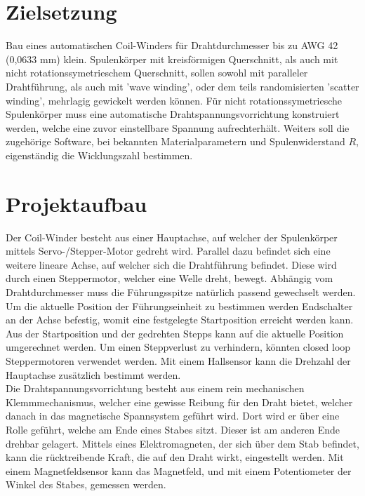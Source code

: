 \section*{Zielsetzung}
Bau eines automatischen Coil-Winders für Drahtdurchmesser bis zu AWG 42 (0,0633 mm) klein. Spulenkörper mit kreisförmigen Querschnitt, als auch mit nicht rotationssymetrieschem Querschnitt, sollen sowohl mit paralleler Drahtführung, als auch mit 'wave winding', oder dem teils randomisierten 'scatter winding', mehrlagig gewickelt werden können. Für nicht rotationssymetriesche Spulenkörper muss eine automatische Drahtspannungsvorrichtung konstruiert werden, welche eine zuvor einstellbare Spannung aufrechterhält. Weiters soll die zugehörige Software, bei bekannten Materialparametern und Spulenwiderstand $R$, eigenständig die Wicklungszahl bestimmen.  

\section*{Projektaufbau}

Der Coil-Winder besteht aus einer Hauptachse, auf welcher der Spulenkörper mittels Servo-/Stepper-Motor gedreht wird. Parallel dazu befindet sich eine weitere lineare Achse, auf welcher sich die Drahtführung befindet. Diese wird durch einen Steppermotor, welcher eine Welle dreht, bewegt. Abhängig vom Drahtdurchmesser muss die Führungsspitze natürlich passend gewechselt werden. Um die aktuelle Position der Führungseinheit zu bestimmen werden Endschalter an der Achse befestig, womit eine festgelegte Startposition erreicht werden kann. Aus der Startposition und der gedrehten Stepps kann auf die aktuelle Position umgerechnet werden. Um einen Steppverlust zu verhindern, könnten closed loop Steppermotoren verwendet werden. Mit einem Hallsensor kann die Drehzahl der Hauptachse zusätzlich bestimmt werden.\\
Die Drahtspannungsvorrichtung besteht aus einem rein mechanischen Klemmmechanismus, welcher eine gewisse Reibung für den Draht bietet, welcher danach in das magnetische Spannsystem geführt wird. Dort wird er über eine Rolle geführt, welche am Ende eines Stabes sitzt. Dieser ist am anderen Ende drehbar gelagert. Mittels eines Elektromagneten, der sich über dem Stab befindet, kann die rücktreibende Kraft, die auf den Draht wirkt, eingestellt werden. Mit einem Magnetfeldsensor kann das Magnetfeld, und mit einem Potentiometer der Winkel des Stabes, gemessen werden.


